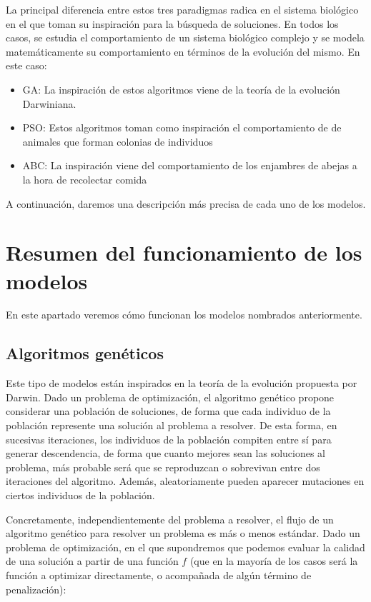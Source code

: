 \documentclass[
  a4paper,
,tablecaptionabove
]{scrartcl}
\providecommand{\tightlist}{%
  \setlength{\itemsep}{0pt}\setlength{\parskip}{0pt}}
\begin{document}
La principal diferencia entre estos tres paradigmas radica en el sistema
biológico en el que toman su inspiración para la búsqueda de soluciones.
En todos los casos, se estudia el comportamiento de un sistema biológico
complejo y se modela matemáticamente su comportamiento en términos de la
evolución del mismo. En este caso:

\begin{itemize}
\tightlist
\item
  GA: La inspiración de estos algoritmos viene de la teoría de la
  evolución Darwiniana.
\item
  PSO: Estos algoritmos toman como inspiración el comportamiento de de
  animales que forman colonias de individuos
\item
  ABC: La inspiración viene del comportamiento de los enjambres de
  abejas a la hora de recolectar comida
\end{itemize}

A continuación, daremos una descripción más precisa de cada uno de los
modelos.

\hypertarget{resumen-del-funcionamiento-de-los-modelos}{%
\section{Resumen del funcionamiento de los
modelos}\label{resumen-del-funcionamiento-de-los-modelos}}

En este apartado veremos cómo funcionan los modelos nombrados
anteriormente.

\hypertarget{algoritmos-genuxe9ticos}{%
\subsection{Algoritmos genéticos}\label{algoritmos-genuxe9ticos}}

Este tipo de modelos están inspirados en la teoría de la evolución
propuesta por Darwin. Dado un problema de optimización, el algoritmo
genético propone considerar una población de soluciones, de forma que
cada individuo de la población represente una solución al problema a
resolver. De esta forma, en sucesivas iteraciones, los individuos de la
población compiten entre sí para generar descendencia, de forma que
cuanto mejores sean las soluciones al problema, más probable será que se
reproduzcan o sobrevivan entre dos iteraciones del algoritmo. Además,
aleatoriamente pueden aparecer mutaciones en ciertos individuos de la
población.

Concretamente, independientemente del problema a resolver, el flujo de
un algoritmo genético para resolver un problema es más o menos estándar.
Dado un problema de optimización, en el que supondremos que podemos
evaluar la calidad de una solución a partir de una función \(f\) (que en
la mayoría de los casos será la función a optimizar directamente, o
acompañada de algún término de penalización):
\end{document}
